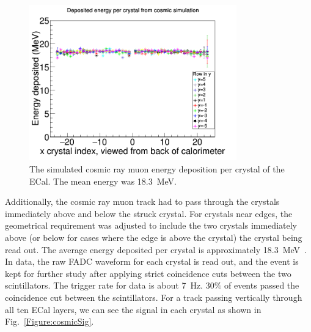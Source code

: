 \begin{figure}[htb]
  \centering
      \includegraphics[width=0.8\textwidth]{pics/performance/cosmicEdep.png}
  \caption[Simulation of energy deposited per ECal module from cosmic rays]{The simulated cosmic ray muon energy deposition per crystal of the ECal. The mean energy was 18.3~MeV.}
  \label{Figure:cosmicEdep}
\end{figure}
Additionally, the cosmic ray muon track had to pass through the crystals immediately above and below the struck crystal. For crystals near edges, the geometrical requirement was adjusted to include the two crystals immediately above (or below for cases where the edge is above the crystal) the crystal being read out. The average energy deposited per crystal is approximately 18.3~MeV~\cite{Agashe:2014kda}. In data, the raw FADC waveform for each crystal is read out, and the event is kept for further study after applying strict coincidence cuts between the two scintillators. The trigger rate for data is about 7~Hz. 30$\%$ of events passed the coincidence cut between the scintillators. For a track passing vertically through all ten ECal layers, we can see the signal in each crystal as shown in Fig.~\ref{Figure:cosmicSig}.

